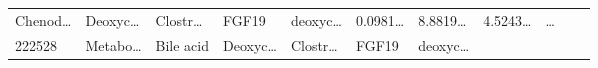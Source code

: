 \documentclass[
]{article}
\begin{document}
\begin{longtable}[]{@{}lllllllllll@{}}
\begin{minipage}[t]{0.07\columnwidth}
Chenod\ldots{}\strut
\end{minipage} & \begin{minipage}[t]{0.09\columnwidth}\raggedright
Deoxyc\ldots{}\strut
\end{minipage} & \begin{minipage}[t]{0.07\columnwidth}\raggedright
Clostr\ldots{}\strut
\end{minipage} & \begin{minipage}[t]{0.07\columnwidth}\raggedright
FGF19\strut
\end{minipage} & \begin{minipage}[t]{0.09\columnwidth}\raggedright
deoxyc\ldots{}\strut
\end{minipage} & \begin{minipage}[t]{0.07\columnwidth}\raggedright
0.0981\ldots{}\strut
\end{minipage} & \begin{minipage}[t]{0.07\columnwidth}\raggedright
8.8819\ldots{}\strut
\end{minipage} & \begin{minipage}[t]{0.07\columnwidth}\raggedright
4.5243\ldots{}\strut
\end{minipage} & \begin{minipage}[t]{0.03\columnwidth}\raggedright
\ldots{}\strut
\end{minipage}\tabularnewline
\begin{minipage}[t]{0.05\columnwidth}\raggedright
222528\strut
\end{minipage} & \begin{minipage}[t]{0.07\columnwidth}\raggedright
Metabo\ldots{}\strut
\end{minipage} & \begin{minipage}[t]{0.07\columnwidth}\raggedright
Bile acid\strut
\end{minipage} & \begin{minipage}[t]{0.09\columnwidth}\raggedright
Deoxyc\ldots{}\strut
\end{minipage} & \begin{minipage}[t]{0.07\columnwidth}\raggedright
Clostr\ldots{}\strut
\end{minipage} & \begin{minipage}[t]{0.07\columnwidth}\raggedright
FGF19\strut
\end{minipage} & \begin{minipage}[t]{0.09\columnwidth}\raggedright
deoxyc\ldots{}\strut
\end{minipage} & \begin{minipage}[t]{0.07\columnwidth}\raggedright

\end{minipage}
\end{longtable}
\end{document}
